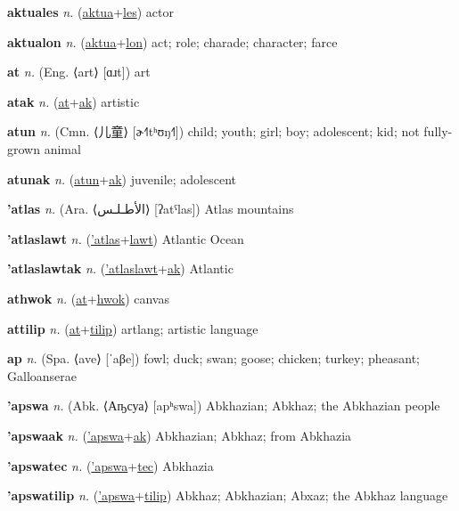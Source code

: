 \textbf{\hypertarget{aktuales}{aktuales}} \textit{n.} (\hyperlink{aktua}{aktua}+\allowbreak \hyperlink{les}{les})
actor

\textbf{\hypertarget{aktualon}{aktualon}} \textit{n.} (\hyperlink{aktua}{aktua}+\allowbreak \hyperlink{lon}{lon})
act; role; charade; character; farce

\textbf{\hypertarget{at}{at}} \textit{n.} (Eng. ⟨art⟩ [ɑɹt])
art

\textbf{\hypertarget{atak}{atak}} \textit{n.} (\hyperlink{at}{at}+\allowbreak \hyperlink{ak}{ak})
artistic

\textbf{\hypertarget{atun}{atun}} \textit{n.} (Cmn. ⟨{\chinese{}儿童}⟩ [ɚ˧˥tʰʊŋ˧˥])
child; youth; girl; boy; adolescent; kid; not fully-grown animal

\textbf{\hypertarget{atunak}{atunak}} \textit{n.} (\hyperlink{atun}{atun}+\allowbreak \hyperlink{ak}{ak})
juvenile; adolescent

\textbf{\hypertarget{'atlas}{'atlas}} \textit{n.} (Ara. ⟨{\arabics{}الأطـلـس‎}⟩ [ʔatˤlas])
Atlas mountains

\textbf{\hypertarget{'atlaslawt}{'atlaslawt}} \textit{n.} (\hyperlink{'atlas}{'atlas}+\allowbreak \hyperlink{lawt}{lawt})
Atlantic Ocean

\textbf{\hypertarget{'atlaslawtak}{'atlaslawtak}} \textit{n.} (\hyperlink{'atlaslawt}{'atlaslawt}+\allowbreak \hyperlink{ak}{ak})
Atlantic

\textbf{\hypertarget{athwok}{athwok}} \textit{n.} (\hyperlink{at}{at}+\allowbreak \hyperlink{hwok}{hwok})
canvas

\textbf{\hypertarget{attilip}{attilip}} \textit{n.} (\hyperlink{at}{at}+\allowbreak \hyperlink{tilip}{tilip})
artlang; artistic language

\textbf{\hypertarget{ap}{ap}} \textit{n.} (Spa. ⟨ave⟩ [ˈaβe])
fowl; duck; swan; goose; chicken; turkey; pheasant; Galloanserae

\textbf{\hypertarget{'apswa}{'apswa}} \textit{n.} (Abk. ⟨Аҧсуа⟩ [apʰswa])
Abkhazian; Abkhaz; the Abkhazian people

\textbf{\hypertarget{'apswaak}{'apswaak}} \textit{n.} (\hyperlink{'apswa}{'apswa}+\allowbreak \hyperlink{ak}{ak})
Abkhazian; Abkhaz; from Abkhazia

\textbf{\hypertarget{'apswatec}{'apswatec}} \textit{n.} (\hyperlink{'apswa}{'apswa}+\allowbreak \hyperlink{tec}{tec})
Abkhazia

\textbf{\hypertarget{'apswatilip}{'apswatilip}} \textit{n.} (\hyperlink{'apswa}{'apswa}+\allowbreak \hyperlink{tilip}{tilip})
Abkhaz; Abkhazian; Abxaz; the Abkhaz language

